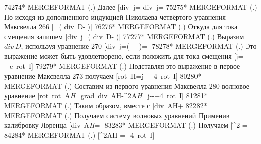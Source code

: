 \documentclass[11pt]{article}
\begin{document}
74274* MERGEFORMAT (.) Далее
{[}div~{{j}\emph{{}}=-div~j=\rho {]}
75275* MERGEFORMAT (.) Но исходя из дополненного индукцией Николаева
четвёртого уравнения Максвелла 266 {[}\rho =\left(
div~D-
\right){]} 76276* MERGEFORMAT (.) Откуда для тока смещения запишем
{[}div~{{j}}{}}=\left(
div~D-
\right){]} 77277* MERGEFORMAT (.) Выразим \(div\ D\), используя
уравнение 270
{[}div~{{j}\emph{{}}=\left(
-\varphi -
\right)=-\varphi {]}
78278* MERGEFORMAT (.) Это выражение может быть удовлетворено, если
положить для тока смещения
{[}{{j}}{}}=--\frac{\varepsilon }{4\pi }\nabla {}\varphi +c~rot~I{]}
79279* MERGEFORMAT (.) Подставляя это выражение в первое уравнение
Максвелла 273 получаем
{[}rot~H=j--\nabla {}\varphi +4\pi ~rot~I{]}
80280* MERGEFORMAT (.) Составим из первого уравнения Максвелла 280
волновое уравнение
{[}rot~rot~{{A}\emph{{H}}=grad~div~{{A}}{H}}-{{\nabla }^{2}}{{A}\emph{{H}}=j--\nabla {}\varphi +4\pi ~rot~I{]}
81281* MERGEFORMAT (.) Таким образом, вместе с
{[}div~{{A}}{H}}+\pi \rho {]}
82282* MERGEFORMAT (.) Получаем систему волновых уравнений Применив
калибровку Лоренца
{[}div~{{A}\emph{{H}}=-\frac{\partial \varphi }{\partial t}{]}
83283* MERGEFORMAT (.) Получаем
{[}{{\nabla }^{2}}\varphi -=-\frac{4\pi \rho }{\varepsilon }{]}
84284* MERGEFORMAT (.)
{[}{{\nabla }^{2}}{{A}}{H}}-=--4\pi ~rot~I{]}
\end{document}

